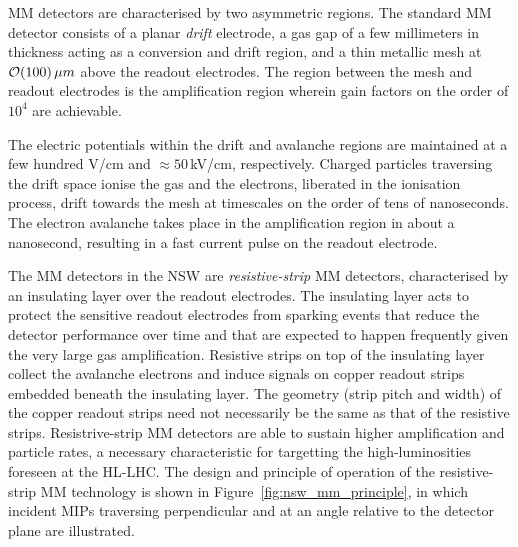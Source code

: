 
MM detectors are characterised by two asymmetric regions.
The standard MM detector consists of a planar \textit{drift} electrode, a gas gap of
a few millimeters in thickness acting as a conversion and drift region, and a thin
metallic mesh at $\mathcal{O}(100)\,\mu m$ above the readout electrodes.
The region between the mesh and readout electrodes is the amplification region wherein
gain factors on the order of $10^4$ are achievable.

The electric potentials within the drift and avalanche regions are maintained
at a few hundred V/cm and $\approx50$\,kV/cm, respectively.
Charged particles traversing the drift space ionise the gas and the electrons, liberated
in the ionisation process, drift towards the mesh at timescales on the order of tens of nanoseconds.
The electron avalanche takes place in the amplification region in about a nanosecond,
resulting in a fast current pulse on the readout electrode.

The MM detectors in the NSW are \textit{resistive-strip} MM detectors, characterised by an insulating
layer over the readout electrodes.
The insulating layer acts to protect the sensitive readout electrodes from sparking events that
reduce the detector performance over time and that are expected to happen frequently given
the very large gas amplification.
Resistive strips on top of the insulating layer collect the avalanche electrons and induce
signals on copper readout strips embedded beneath the insulating layer.
The geometry (strip pitch and width) of the copper readout strips need not necessarily be the
same as that of the resistive strips.
Resistrive-strip MM detectors are able to sustain higher amplification and particle rates, a necessary
characteristic for targetting the high-luminosities foreseen at the HL-LHC.
The design and principle of operation of the resistive-strip MM technology is shown in Figure~\ref{fig:nsw_mm_principle},
in which incident MIPs traversing perpendicular and at an angle relative to the detector plane
are illustrated.

